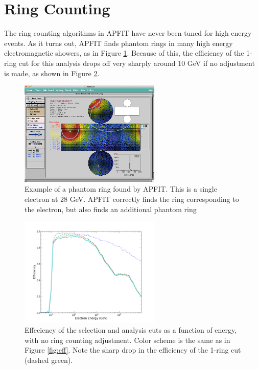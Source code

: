 \section{Ring Counting}
\label{sec:ring_counting}
The ring counting algorithms in APFIT have never been tuned for high energy events.  As it turns out, APFIT finds phantom rings in many high energy electromagnetic showers, as in Figure \ref{fig:phantom_ring.png}.  Because of this, the efficiency of the 1-ring cut for this analysis drops off very sharply around 10 GeV if no adjustment is made, as shown in Figure \ref{fig:eff_oldrings}. 
\begin{figure}
	\includegraphics[width=0.6\textwidth]{figures/display_phantom.png}
	\caption{Example of a phantom ring found by APFIT.  This is a single electron at 28 GeV.  APFIT correctly finds the ring corresponding to the electron, but also finds an additional phantom ring}
	\label{fig:phantom_ring.png}
\end{figure}

\begin{figure}
	\includegraphics[width=0.6\textwidth]{figures/efficiency_30MeV_1TeV_old1ring.pdf}
	\caption{Effeciency of the selection and analysis cuts as a function of energy, with no ring counting adjustment.  Color scheme is the same as in Figure \ref{fig:eff}.  Note the sharp drop in the efficiency of the 1-ring cut (dashed green).}
	\label{fig:eff_oldrings}
\end{figure}

